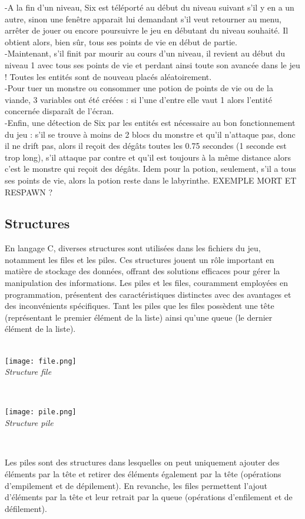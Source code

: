 \documentclass[10pt]{article}
\begin{document}
\begin{center}
   -A la fin d'un niveau, Six est téléporté au début du niveau suivant s'il y en a un autre, sinon une fenêtre apparait lui demandant s'il veut retourner au menu, arrêter de jouer ou encore poursuivre le jeu en débutant du niveau souhaité. Il obtient alors, bien sûr, tous ses points de vie en début de partie.\\
   -Maintenant, s'il finit par mourir au cours d'un niveau, il revient au début du niveau 1 avec tous ses points de vie et perdant ainsi toute son avancée dans le jeu ! Toutes les entités sont de nouveau placés aléatoirement.\\
   -Pour tuer un monstre ou consommer une potion de points de vie ou de la viande, 3 variables ont été créées : si l'une d'entre elle vaut 1 alors l'entité concernée disparaît de l'écran.\\
   -Enfin, une détection de Six par les entités est nécessaire au bon fonctionnement du jeu : s'il se trouve à moins de 2 blocs du monstre et qu'il n'attaque pas, donc il ne drift pas, alors il reçoit des dégâts toutes les 0.75 secondes (1 seconde est trop long), s'il attaque par contre et qu'il est toujours à la même distance alors c'est le monstre qui reçoit des dégâts. Idem pour la potion, seulement, s'il a tous ses points de vie, alors la potion reste dans le labyrinthe. EXEMPLE MORT ET RESPAWN ?
\clearpage   
   \subsection{Structures}

En langage C, diverses \gls{structures} sont utilisées dans les fichiers du jeu, notamment les files et les piles. Ces structures jouent un rôle important en matière de stockage des données, offrant des solutions efficaces pour gérer la manipulation des informations. Les piles et les files, couramment employées en programmation, présentent des caractéristiques distinctes avec des avantages et des inconvénients spécifiques. Tant les piles que les files possèdent une tête (représentant le premier élément de la liste) ainsi qu'une queue (le dernier élément de la liste).
\\\\
\begin{center}
\texttt{[image: file.png]}\\
\caption{{\emph{Structure file}}}
\label{fig1}\\
\end{center}
\begin{center}
\texttt{[image: pile.png]}\\
\caption{{\emph{Structure pile}}}
 \label{fig2}\\
 \end{center}
Les piles sont des structures dans lesquelles on peut uniquement ajouter des éléments par la tête et retirer des éléments également par la tête (opérations d'empilement et de dépilement). En revanche, les files permettent l'ajout d'éléments par la tête et leur retrait par la queue (opérations d'enfilement et de défilement).


\end{center}
\end{document}
